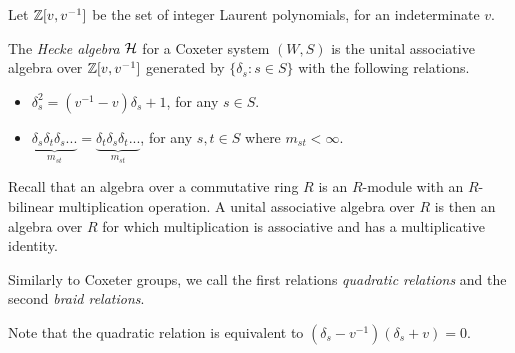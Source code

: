 Let $\mathbb{Z}[v, v^{-1}]$ be the set of integer Laurent polynomials, for an indeterminate $v$.

\begin{definition}
    The \textit{Hecke algebra} $\mathcal{H}$ for a Coxeter system $(W,S)$ is the unital associative algebra over $\mathbb{Z}[v,v^{-1}]$ generated by $\{\delta_s : s \in S\}$ with the following relations.
    \begin{itemize}
        \item $\delta_s^2 = (v^{-1} - v)\delta_s + 1$, for any $s \in S$.
        \item $\underbrace{\delta_s \delta_t \delta_s...}_{m_{st}} = \underbrace{\delta_t \delta_s \delta_t...}_{m_{st}}$, for any $s,t \in S$ where $m_{st} < \infty$.
    \end{itemize}
\end{definition}

Recall that an algebra over a commutative ring $R$ is an $R$-module with an $R$-bilinear multiplication operation. A unital associative algebra over $R$ is then an algebra over $R$ for which multiplication is associative and has a multiplicative identity.

\n
Similarly to Coxeter groups, we call the first relations \textit{quadratic relations} and the second \textit{braid relations}.


\n
Note that the quadratic relation is equivalent to $(\delta_s - v^{-1})(\delta_s + v) = 0$.




